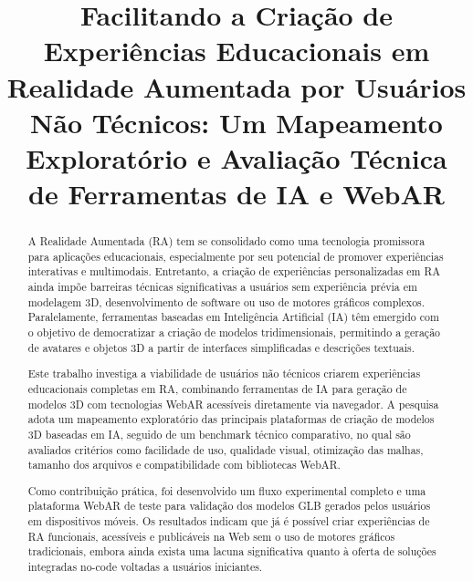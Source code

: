 \documentclass[conference]{IEEEtran}
\begin{document}
\title{Facilitando a Criação de Experiências Educacionais em Realidade Aumentada por Usuários Não Técnicos:  
Um Mapeamento Exploratório e Avaliação Técnica de Ferramentas de IA e WebAR}

\author{
}

\maketitle

\begin{abstract}
A Realidade Aumentada (RA) tem se consolidado como uma tecnologia promissora para aplicações educacionais, especialmente por seu potencial de promover experiências interativas e multimodais. Entretanto, a criação de experiências personalizadas em RA ainda impõe barreiras técnicas significativas a usuários sem experiência prévia em modelagem 3D, desenvolvimento de software ou uso de motores gráficos complexos. Paralelamente, ferramentas baseadas em Inteligência Artificial (IA) têm emergido com o objetivo de democratizar a criação de modelos tridimensionais, permitindo a geração de avatares e objetos 3D a partir de interfaces simplificadas e descrições textuais.

Este trabalho investiga a viabilidade de usuários não técnicos criarem experiências educacionais completas em RA, combinando ferramentas de IA para geração de modelos 3D com tecnologias WebAR acessíveis diretamente via navegador. A pesquisa adota um mapeamento exploratório das principais plataformas de criação de modelos 3D baseadas em IA, seguido de um benchmark técnico comparativo, no qual são avaliados critérios como facilidade de uso, qualidade visual, otimização das malhas, tamanho dos arquivos e compatibilidade com bibliotecas WebAR.

Como contribuição prática, foi desenvolvido um fluxo experimental completo e uma plataforma WebAR de teste para validação dos modelos GLB gerados pelos usuários em dispositivos móveis. Os resultados indicam que já é possível criar experiências de RA funcionais, acessíveis e publicáveis na Web sem o uso de motores gráficos tradicionais, embora ainda exista uma lacuna significativa quanto à oferta de soluções integradas no-code voltadas a usuários iniciantes.
\end{abstract}
\end{document}

